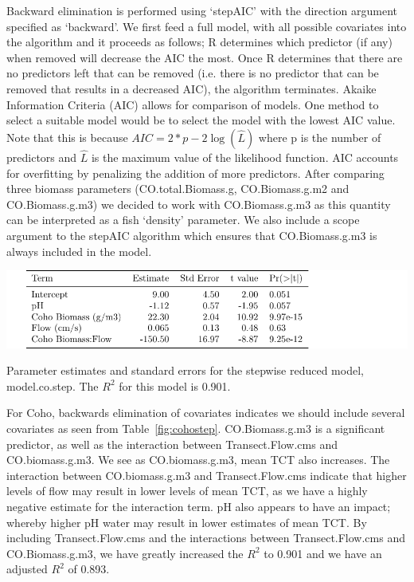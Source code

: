 \vspace{5mm}

Backward elimination is performed using `stepAIC' \citep{MASS} with the direction argument specified as `backward'. We first feed a full model, with all possible covariates into the algorithm and it proceeds as follows; R determines which predictor (if any) when removed will decrease the AIC the most.  Once R determines that there are no predictors left that can be removed (i.e. there is no predictor that can be removed that results in a decreased AIC), the algorithm terminates. Akaike Information Criteria (AIC) \citep{AIC} allows for comparison of models. One method to select a suitable model would be to select the model with the lowest AIC value. Note that this is because $AIC=2*p-2\log(\hat L)$ where p is the number of predictors and $\hat{L}$ is the maximum value of the likelihood function. 
AIC accounts for overfitting by penalizing the addition of more predictors. After comparing three biomass parameters (CO.total.Biomass.g, CO.Biomass.g.m2 and CO.Biomass.g.m3) we decided to work with CO.Biomass.g.m3 as this quantity can be interpreted as a fish `density' parameter. We also include a scope argument to the stepAIC algorithm which ensures that CO.Biomass.g.m3 is always included in the model.




\vspace{5mm}

\begin{table}[H]
\includegraphics{Chapter5Images/cohored.pdf}
\caption{\hspace{1mm} Parameter estimates and standard errors for the stepwise reduced model, model.co.step. The $R^{2}$ for this model is 0.901.}
\label{fig:cohostep}
\end{table}



For Coho, backwards elimination of covariates indicates we should include several covariates as seen from Table~\ref{fig:cohostep}. CO.Biomass.g.m3 is a significant predictor, as well as the interaction between Transect.Flow.cms and CO.biomass.g.m3. We see as CO.biomass.g.m3, mean TCT also increases.  The interaction between CO.biomass.g.m3 and Transect.Flow.cms indicate that higher levels of flow may result in lower levels of mean TCT, as we have a highly negative estimate for the interaction term. pH also appears to have an impact; whereby higher pH water may result in lower estimates of mean TCT. By including Transect.Flow.cms and the interactions between Transect.Flow.cms and CO.Biomass.g.m3, we have greatly increased the $R^{2}$ to 0.901 and we have an adjusted $R^{2}$ of 0.893.

